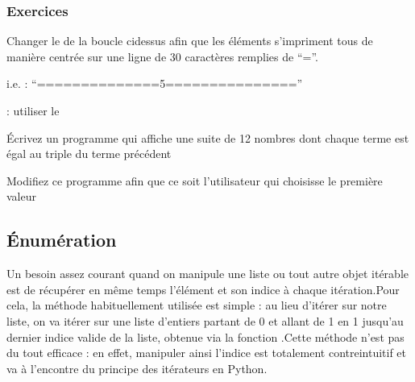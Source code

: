 \documentclass[letterpaper,10pt,english]{sphinxmanual}
\begin{document}
\subsubsection{Exercices}
\label{\detokenize{src/OCI04_Boucles:exercices}}
Changer le  de la boucle ci\sphinxhyphen{}dessus afin que les éléments s’impriment tous de manière centrée sur une ligne de 30 caractères remplies de “=”.

i.e. : “==============5===============”

: utiliser le 

\begin{sphinxVerbatim}[commandchars=\\\{\}]
   \PYG{p}{[}   \PYG{p}{]}
\end{sphinxVerbatim}

\begin{sphinxVerbatim}[commandchars=\\\{\}]
   \PYG{p}{[}   \PYG{p}{]}
\end{sphinxVerbatim}

Écrivez un programme qui affiche une suite de 12 nombres dont chaque terme est égal au triple du terme précédent

Modifiez ce programme afin que ce soit l’utilisateur qui choisisse le première valeur


\subsection{Énumération}
\label{\detokenize{src/OCI04_Boucles:enumeration}}
Un besoin assez courant quand on manipule une liste ou tout autre objet itérable est de récupérer en même temps l’élément et son indice à chaque itération.Pour cela, la méthode habituellement utilisée est simple : au lieu d’itérer sur notre liste, on va itérer sur une liste d’entiers partant de 0 et allant de 1 en 1 jusqu’au dernier indice valide de la liste, obtenue via la fonction .Cette méthode n’est pas du tout efficace : en effet, manipuler ainsi l’indice est totalement contre\sphinxhyphen{}intuitif et va à l’encontre du principe des itérateurs en Python.
\end{document}
